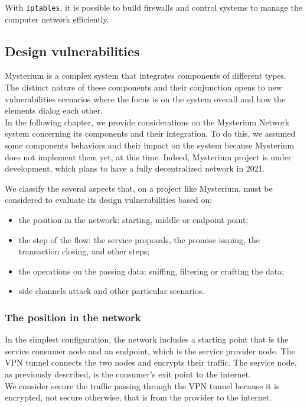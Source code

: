 \documentclass[12pt]{article}
\begin{document}
	With \lstinline{iptables}, it is possible to build firewalls and control systems to manage the computer network efficiently.


	\subsection{Design vulnerabilities}

	Mysterium is a complex system that integrates components of different types. The distinct nature of these components and their conjunction opens to new vulnerabilities scenarios where the focus is on the system overall and how the elements dialog each other.\\
	In the following chapter, we provide considerations on the Mysterium Network system concerning its components and their integration. To do this, we assumed some components behaviors and their impact on the system because Mysterium does not implement them yet, at this time. Indeed, Mysterium project is under development, which plans to have a fully decentralized network in 2021.\\
	\bigbreak

	We classify the several aspects that, on a project like Mysterium, must be considered to evaluate its design vulnerabilities based on:
	\begin{itemize}
		\item the position in the network: starting, middle or endpoint point;
		\item the step of the flow: the service proposals, the promise issuing, the transaction closing, and other steps;
		\item the operations on the passing data: sniffing, filtering or crafting the data;
		\item side channels attack and other particular scenarios.
	\end{itemize}
	
	\subsubsection{The position in the network}

	In the simplest configuration, the network includes a starting point that is the service consumer node and an endpoint, which is the service provider node. The VPN tunnel connects the two nodes and encrypts their traffic. The service node, as previously described, is the consumer's exit point to the internet.\\
	We consider secure the traffic passing through the VPN tunnel because it is encrypted, not secure otherwise, that is from the provider to the internet.\\
\end{document}
